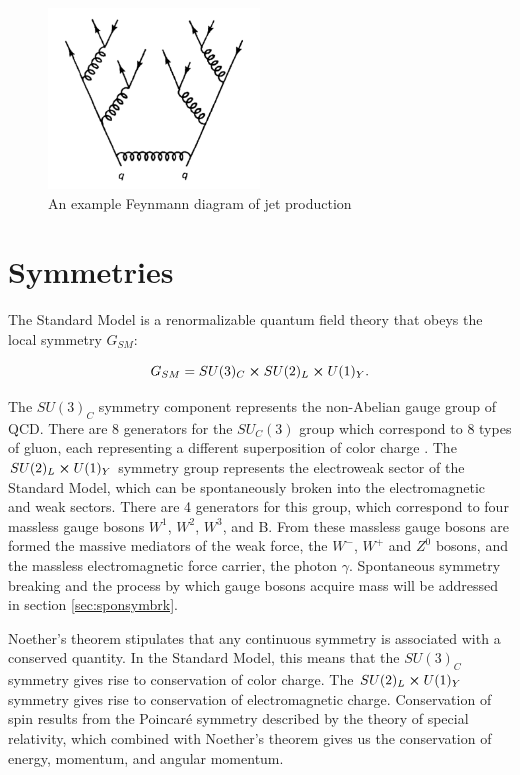 \begin{figure}
	\centering
	\includegraphics[width=0.5\textwidth]{figures/ch1/jet_feynmann.png}
	\caption{An example Feynmann diagram of jet production}
	\label{fig:jet_feynmann}
\end{figure}

\section{Symmetries}

The Standard Model is a renormalizable quantum field theory that obeys the local symmetry $G_{SM}$:

\begin{equation}
	G_{SM} = SU(3)_C \cross SU(2)_L \cross U(1)_Y .
\end{equation}

The $SU(3)_C$ symmetry component represents the non-Abelian gauge group of QCD. There are 8 generators for the $SU_C (3)$ group which correspond to 8 types of gluon, each representing a different superposition of color charge \cite{pdg}. The $SU(2)_L \cross U(1)_Y$ symmetry group represents the electroweak sector of the Standard Model, which can be spontaneously broken into the electromagnetic and weak sectors. There are 4 generators for this group, which correspond to four massless gauge bosons $W^1$, $W^2$, $W^3$, and B. From these massless gauge bosons are formed the massive mediators of the weak force, the $W^-$, $W^+$ and $Z^0$ bosons, and the massless electromagnetic force carrier, the photon $\gamma$. Spontaneous symmetry breaking and the process by which gauge bosons acquire mass will be addressed in section \ref{sec:sponsymbrk}. \par

Noether's theorem \cite{Noether} stipulates that any continuous symmetry is associated with a conserved quantity. In the Standard Model, this means that the $SU(3)_C$ symmetry gives rise to conservation of color charge. The $SU(2)_L \cross U(1)_Y$ symmetry gives rise to conservation of electromagnetic charge. Conservation of spin results from the Poincar\'e symmetry described by the theory of special relativity, which combined with Noether's theorem gives us the conservation of energy, momentum, and angular momentum.\par

